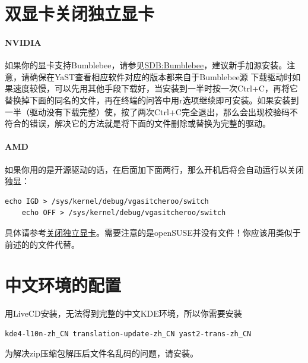 \section[双显卡]{双显卡关闭独立显卡}
\paragraph{NVIDIA} 如果你的显卡支持Bumblebee，请参见\href{https://zh.opensuse.org/SDB:Bumblebee}{SDB:Bumblebee}，建议新手加源安装。注意，请确保在YaST查看相应软件对应的版本都来自于Bumblebee源
下载驱动时如果速度较慢，可以先用其他手段下载好，当安装到一半时按一次Ctrl+C，再将它替换掉下面的同名的文件，再在终端的问答中用r选项继续即可安装。如果安装到一半（驱动没有下载完整）使，按了两次Ctrl+C完全退出，那么会出现校验码不符合的错误，解决它的方法就是将下面的文件删除或替换为完整的驱动。

\paragraph{AMD} 如果你用的是开源驱动的话，在后面加下面两行，那么开机后将会自动运行以关闭独显：
\begin{Verbatim}[formatcom=\color{codec}]
    echo IGD > /sys/kernel/debug/vgasitcheroo/switch
    echo OFF > /sys/kernel/debug/vgasitcheroo/switch    
\end{Verbatim}
具体请参考\href{https://linuxtoy.org/archives/how-to-use-vga-switcheroo-disable-video-card-linux-kms.html}{关闭独立显卡}。需要注意的是openSUSE并没有文件！你应该用类似于前述的的文件代替。 

\section{中文环境的配置}
用LiveCD安装，无法得到完整的中文KDE环境，所以你需要安装
\begin{Verbatim}[formatcom=\color{codec}]
    kde4-l10n-zh_CN translation-update-zh_CN yast2-trans-zh_CN
\end{Verbatim}

为解决zip压缩包解压后文件名乱码的问题，请安装。

